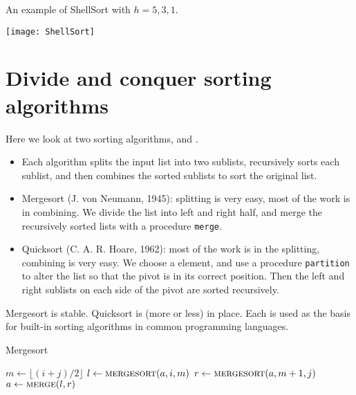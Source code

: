 \begin{Example}
An example of ShellSort with $h = 5, 3, 1$.
\begin{center}
\texttt{[image: ShellSort]} 
\end{center}
\end{Example}


\chapter{Divide and conquer sorting algorithms}  %
Here we look at two sorting algorithms,  and .
\begin{itemize}
\item Each algorithm splits the input list into two sublists, 
recursively sorts each sublist, and then combines the sorted sublists to sort 
the original list.
\item Mergesort (J. von Neumann, 1945): splitting is very easy, most 
of the work is in combining. 
We divide the list into left and right half, and merge the recursively sorted 
lists with a procedure \texttt{merge}. 
\item Quicksort (C. A. R. Hoare, 1962): most of the work is in the 
splitting, combining is very easy. We choose a  element, and use a 
procedure \texttt{partition} to alter the list so that the pivot is in its 
correct position. Then the left and right sublists on each side of the pivot 
are sorted recursively.
\end{itemize}
Mergesort is stable. Quicksort is (more or less) in place. Each is used as the basis for 
built-in sorting algorithms in common programming languages.

\begin{algorithm}[H]
  \caption{Mergesort
    \label{alg:mergesort}}
\begin{algorithmic}[0]
\State $m \gets \lfloor (i + j)/2 \rfloor$ 
\State $l \gets \Call{mergesort}{a,i,m}$ 
\State $r \gets  \Call{mergesort}{a,m+1,j}$ 
\State $a \gets  \Call{merge}{l, r}$ 
\EndIf
\State {}
\EndFunction  
\end{algorithmic}
\end{algorithm}

